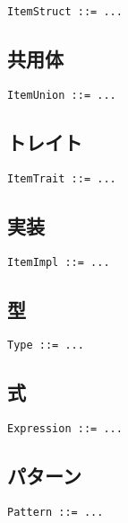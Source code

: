 \documentclass[dvipdfmx,uplatex,papersize,a4paper,10pt]{jsbook}
\theoremstyle{definition}
\begin{document}
\begin{lstlisting}[language=BNFLike, gobble=2]
  ItemStruct ::= ...
\end{lstlisting}

\subsection{共用体}

\begin{lstlisting}[language=BNFLike, gobble=2]
  ItemUnion ::= ...
\end{lstlisting}

\subsection{トレイト}

\begin{lstlisting}[language=BNFLike, gobble=2]
  ItemTrait ::= ...
\end{lstlisting}

\subsection{実装}

\begin{lstlisting}[language=BNFLike, gobble=2]
  ItemImpl ::= ...
\end{lstlisting}

\subsection{型}

\begin{lstlisting}[language=BNFLike, gobble=2]
  Type ::= ...
\end{lstlisting}

\subsection{式}

\begin{lstlisting}[language=BNFLike, gobble=2]
  Expression ::= ...
\end{lstlisting}

\subsection{パターン}

\begin{lstlisting}[language=BNFLike, gobble=2]
  Pattern ::= ...
\end{lstlisting}
\end{document}
